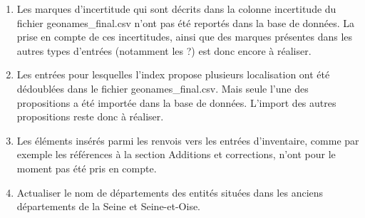 \documentclass[a4paper,12pt,twoside]{book}
\begin{document}
\begin{enumerate}
		\item Les marques d'incertitude qui sont décrits dans la colonne \og incertitude\fg{} du fichier geonames\_final.csv n'ont pas été reportés dans la base de données. La prise en compte de ces incertitudes, ainsi que des marques présentes dans les autres types d'entrées (notamment les \og ?\fg{}) est donc encore à réaliser.
		
		\item Les entrées pour lesquelles l'index propose plusieurs localisation ont été dédoublées dans le fichier geonames\_final.csv. Mais seule l'une des propositions a été importée dans la base de données. L'import des autres propositions reste donc à réaliser.
		
		\item Les éléments insérés parmi les renvois vers les entrées d'inventaire, comme par exemple les références à la section \og Additions et corrections\fg{}, n'ont pour le moment pas été pris en compte.
		
		\item Actualiser le nom de départements des entités situées dans les anciens départements de la Seine et Seine-et-Oise.
		
	\end{enumerate}
	
	\backmatter
	\listoffigures
	\tableofcontents
	
\end{document}
